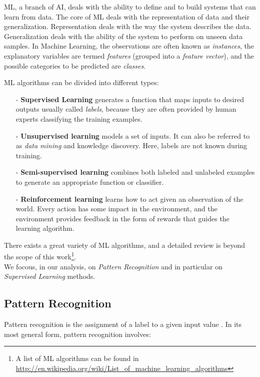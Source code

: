 \Gls{ML}, a branch of \Gls{AI}, deals with the ability to define and to build systems that can learn from data.
The core of \Gls{ML} deals with the representation of data and their generalization. Representation deals with the way the system describes the data.
Generalization deals with the ability of the system to perform on unseen data samples.
In Machine Learning, the observations are often known as \textit{instances},
the explanatory variables are termed \textit{features} (grouped into a \textit{feature vector}), and the possible categories to be predicted are \textit{classes}. 


\Gls{ML} algorithms can be divided into different types:
\begin{itemize} 
 \item [-] \textbf{Supervised Learning} generates a function that maps inputs to desired outputs usually called \textit{labels},
	because they are often provided by human experts classifying the training examples.
 \item [-] \textbf{Unsupervised learning} models a set of inputs. It can also be referred to as \textit{data mining} and knowledge discovery. Here, labels are not known during training.
 \item [-] \textbf{Semi-supervised learning} combines both labeled and unlabeled examples to generate an appropriate function or classifier. 
 \item [-] \textbf{Reinforcement learning} learns how to act given an observation of the world. Every action has some impact in the environment, and the environment provides feedback in the form of rewards that guides the learning algorithm.
\end{itemize}

There exists a great variety of \Gls{ML} algorithms, and a detailed review is beyond the scope of this work\footnote{A list of \Gls{ML} algorithms can be found in
\url{http://en.wikipedia.org/wiki/List_of_machine_learning_algorithms}}.\\
We focous, in our analysis, on \textit{Pattern Recognition} and in particular on \textit{Supervised Learning} methods.

\subsection{Pattern Recognition}

Pattern recognition is the assignment of a label to a given input value \cite{bishop2006pattern, theodoridis2008pattern}. In its most general form, pattern recognition involves:

